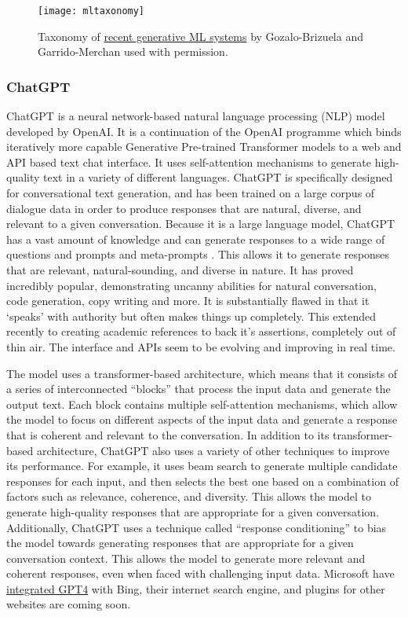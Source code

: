 \begin{figure}
  \centering
    \texttt{[image: mltaxonomy]}
  \caption{Taxonomy of \href{https://arxiv.org/abs/2301.04655}{recent generative ML systems} by Gozalo-Brizuela and Garrido-Merchan used with permission.}
  \label{fig:MLtaxonomy}
\end{figure}
\subsubsection{ChatGPT}
ChatGPT is a neural network-based natural language processing (NLP) model developed by OpenAI. It is a continuation of the OpenAI programme which binds iteratively more capable Generative Pre-trained Transformer models to a web and API based text chat interface. It uses self-attention mechanisms to generate high-quality text in a variety of different languages. ChatGPT is specifically designed for conversational text generation, and has been trained on a large corpus of dialogue data in order to produce responses that are natural, diverse, and relevant to a given conversation. Because it is a large language model, ChatGPT has a vast amount of knowledge and can generate responses to a wide range of questions and prompts and meta-prompts \cite{hou2022metaprompting}. This allows it to generate responses that are relevant, natural-sounding, and diverse in nature. It has proved incredibly popular, demonstrating uncanny abilities for natural conversation, code generation, copy writing and more. It is substantially flawed in that it `speaks' with authority but often makes things up completely. This extended recently to creating academic references to back it's assertions, completely out of thin air. The interface and APIs seem to be evolving and improving in real time.\par
The model uses a transformer-based architecture, which means that it consists of a series of interconnected ``blocks'' that process the input data and generate the output text. Each block contains multiple self-attention mechanisms, which allow the model to focus on different aspects of the input data and generate a response that is coherent and relevant to the conversation. In addition to its transformer-based architecture, ChatGPT also uses a variety of other techniques to improve its performance. For example, it uses beam search to generate multiple candidate responses for each input, and then selects the best one based on a combination of factors such as relevance, coherence, and diversity. This allows the model to generate high-quality responses that are appropriate for a given conversation. Additionally, ChatGPT uses a technique called ``response conditioning'' to bias the model towards generating responses that are appropriate for a given conversation context. This allows the model to generate more relevant and coherent responses, even when faced with challenging input data. Microsoft have  \href{https://medium.com/@owenyin/scoop-oh-the-things-youll-do-with-bing-s-chatgpt-62b42d8d7198}{integrated GPT4} with Bing, their internet search engine, and plugins for other websites are coming soon.\par 
